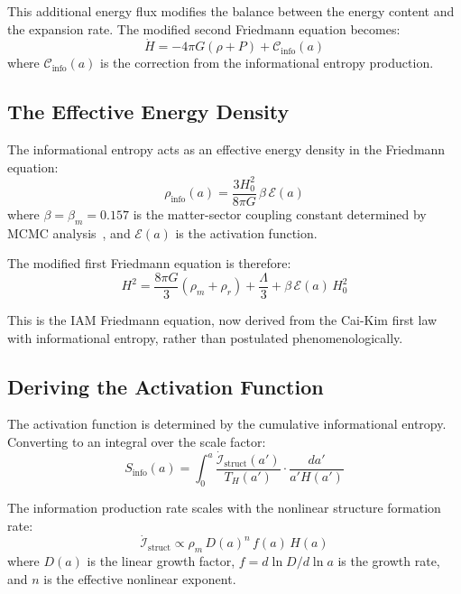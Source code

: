 \documentclass[aps,prd,twocolumn,superscriptaddress,nofootinbib]{revtex4-2}
\begin{document}
This additional energy flux modifies the balance between the energy content and the expansion rate. The modified second Friedmann equation becomes:
\begin{equation}
\dot{H} = -4\pi G(\rho + P) + \mathcal{C}_\text{info}(a)
\label{eq:modified_friedmann2}
\end{equation}
where $\mathcal{C}_\text{info}(a)$ is the correction from the informational entropy production.

\subsection{The Effective Energy Density}

The informational entropy acts as an effective energy density in the Friedmann equation:
\begin{equation}
\rho_\text{info}(a) = \frac{3H_0^2}{8\pi G}\,\beta\,\mathcal{E}(a)
\label{eq:rho_info}
\end{equation}
where $\beta = \beta_m = 0.157$ is the matter-sector coupling constant determined by MCMC analysis~\cite{Mahaffey2026compendium}, and $\mathcal{E}(a)$ is the activation function.

The modified first Friedmann equation is therefore:
\begin{equation}
\boxed{H^2 = \frac{8\pi G}{3}\left(\rho_m + \rho_r\right) + \frac{\Lambda}{3} + \beta\,\mathcal{E}(a)\,H_0^2}
\label{eq:modified_friedmann}
\end{equation}

This is the IAM Friedmann equation, now derived from the Cai-Kim first law with informational entropy, rather than postulated phenomenologically.

\subsection{Deriving the Activation Function}

The activation function is determined by the cumulative informational entropy. Converting to an integral over the scale factor:
\begin{equation}
S_\text{info}(a) = \int_0^a \frac{\dot{\mathcal{I}}_\text{struct}(a')}{T_H(a')} \cdot \frac{da'}{a'H(a')}
\end{equation}

The information production rate scales with the nonlinear structure formation rate:
\begin{equation}
\dot{\mathcal{I}}_\text{struct} \propto \rho_m\,D(a)^n\,f(a)\,H(a)
\end{equation}
where $D(a)$ is the linear growth factor, $f = d\ln D/d\ln a$ is the growth rate, and $n$ is the effective nonlinear exponent.
\end{document}
